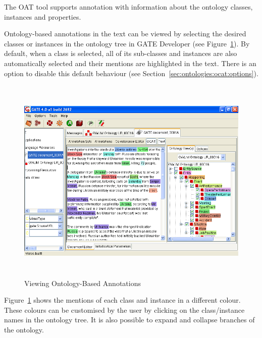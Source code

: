 {The OAT tool supports annotation with information about the ontology classes,
instances and properties.


Ontology-based annotations in the text can be viewed by selecting the desired classes or instances in the ontology tree in GATE Developer 
(see Figure~\ref{fig:ocat:view}). By default, when a class is
selected, all of its sub-classes and instances are also automatically
selected and their mentions are highlighted in the text. There is an
option to disable this default behaviour (see
Section~\ref{sec:ontologies:ocat:options}).

\begin{figure}
\includegraphics[height=10cm]{ontology_ocat_view.png}
\caption{Viewing Ontology-Based Annotations} \label{fig:ocat:view}
\end{figure}

Figure~\ref{fig:ocat:view} shows the mentions of each class and instance in a different
colour. These colours can be customised by the user by clicking on
the class/instance names in the ontology tree. It is also possible to expand
and collapse branches of the ontology.


}
